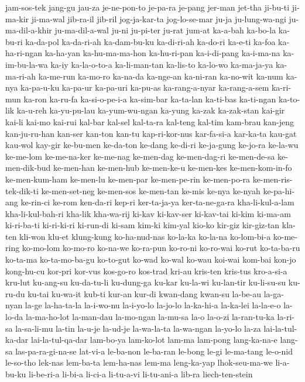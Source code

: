 {jam-sos-tek jang-gu jau-za je-ne-pon-to je-pa-ra je-pang jer-man jet-tha
ji-bu-ti ji-ma-kir ji-ma-wal jib-ra-il jib-ril jog-ja-kar-ta jog-lo-se-mar
ju-ja ju-lung-wa-ngi ju-ma-dil-a-khir ju-ma-dil-a-wal ju-ni ju-pi-ter
ju-rat jum-at ka-a-bah ka-bo-la ka-bu-ri ka-da-pol ka-da-ri-ah
ka-dam-bu-ku ka-di-ri-ah ka-do-ri ka-e-ti ka-foa ka-ha-ri-ngan ka-ha-yan
ka-hu-ma-ma-hon ka-hu-ri-pan ka-i-di-pang ka-i-ma-na ka-im-bu-la-wa ka-iy
ka-la-o-to-a ka-li-man-tan ka-lis-to ka-lo-wo ka-ma-ja-ya ka-ma-ri-ah
ka-me-run ka-mo-ro ka-na-da ka-nge-an ka-ni-ran ka-no-wit ka-num ka-nya
ka-pa-u-ku ka-pa-ur ka-pa-uri ka-pu-as ka-rang-a-nyar ka-rang-a-sem
ka-ri-mun ka-ron ka-ru-fa ka-si-o-pe-i-a ka-sim-bar ka-ta-lan ka-ti-bas
ka-ti-ngan ka-to-lik ka-u-reh ka-yu-pu-lau ka-yum-wu-ngan ka-yung ka-zak
ka-zak-stan kai-gir kai-li kai-mo kai-rui kal-bar kal-sel kal-ta-ra
kal-teng kal-tim kam-brau kan-jeng kan-ju-ru-han kan-ser kan-ton kan-tu
kap-ri-kor-nus kar-fa-si-a kar-ka-ta kau-gat kau-wol kay-gir ke-bu-men
ke-da-ton ke-dang ke-di-ri ke-ja-gung ke-jo-ra ke-la-wu ke-me-lom
ke-me-na-ker ke-me-nag ke-men-dag ke-men-dag-ri ke-men-de-sa
ke-men-dik-bud ke-men-han ke-men-hub ke-men-ke-u ke-men-kes
ke-men-kom-in-fo ke-men-kum-ham ke-men-lu ke-men-par ke-men-pe-rin
ke-men-po-ra ke-men-ris-tek-dik-ti ke-men-set-neg ke-men-sos ke-men-tan
ke-mis ke-nya ke-nyah ke-pa-hi-ang ke-rin-ci ke-rom ken-da-ri kep-ri
ker-ta-ja-ya ker-ta-ne-ga-ra kha-li-kul-a-lam kha-li-kul-bah-ri kha-lik
kha-wa-rij ki-kav ki-kav-ser ki-kav-tai ki-kim ki-ma-am ki-ri-ba-ti
ki-ri-ki-ri ki-run-di ki-sam kim-ki kim-yal kio-ko kir-giz kir-giz-tan
kla-ten kli-won klu-et klung-kung ko-ha-nud-nas ko-la-ka ko-la-na
ko-lom-bi-a ko-me-ring ko-mo-lom ko-mo-ro ko-na-we ko-ra-pun ko-ro-ni
ko-ro-wai ko-rut ko-ta-ba-ru ko-ta-ma ko-ta-mo-ba-gu ko-to-gut ko-wad
ko-wal ko-wau koi-wai kom-bai kon-jo kong-hu-cu kor-pri kor-vus kos-go-ro
kos-trad kri-au kris-ten kris-tus kro-a-si-a kru-lut ku-ang-su ku-da-tu-li
ku-dung-ga ku-kar ku-la-wi ku-lan-tir ku-li-su-su ku-ru-du ku-tai ku-wa-it
kub-ti kur-an kur-di kwan-dang kwan-su la-be-au la-ga-nyan la-ge
la-ha-ta-la la-i-wo-nu la-i-yo-lo la-jo-lo la-ka-hi-a la-ka-lei la-la-e-o
la-lo-da la-ma-ho-lot la-man-dau la-mo-ngan la-mu-sa la-o la-o-zi
la-ran-tu-ka la-ri-sa la-sa-li-mu la-tin la-u-je la-ud-je la-wa-la-ta
la-wa-ngan la-yo-lo la-za lai-la-tul-ka-dar lai-la-tul-qa-dar lam-bo-ya
lam-ko-lot lam-ma lam-pong lang-ka-na-e lang-sa las-pa-ra-gi-na-se
lat-vi-a le-ba-non le-ba-ran le-bong le-gi le-ma-tang le-o-nid le-so-tho
lek-nas lem-ba-ta lem-ha-nas lem-ma leng-ka-yap lhok-seu-ma-we li-a-bu-ku
li-be-ri-a li-bi-a li-ci-a li-tu-a-vi li-tu-ani-a lib-ra liech-ten-stein
}
